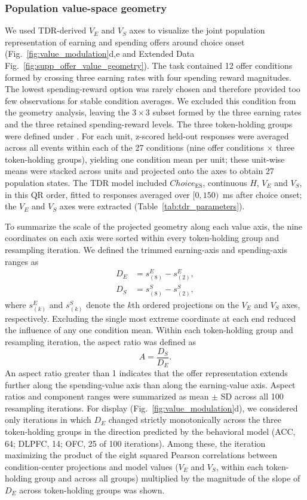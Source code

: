 \documentclass[pdflatex,sn-mathphys-num]{sn-jnl}%
\begin{document}
\subsubsection{Population value-space geometry}\label{sec:m_geometry}
We used TDR-derived $V_E$ and $V_S$ axes to visualize the joint population representation of earning and spending offers around choice onset (Fig.~\ref{fig:value_modulation}d,e and Extended Data Fig.~\ref{fig:supp_offer_value_geometry}). The task contained 12 offer conditions formed by crossing three earning rates with four spending reward magnitudes. The lowest spending-reward option was rarely chosen and therefore provided too few observations for stable condition averages. We excluded this condition from the geometry analysis, leaving the $3\times3$ subset formed by the three earning rates and the three retained spending-reward levels. The three token-holding groups were defined under . For each unit, z-scored held-out responses were averaged across all events within each of the 27 conditions (nine offer conditions $\times$ three token-holding groups), yielding one condition mean per unit; these unit-wise means were stacked across units and projected onto the axes to obtain 27 population states. The TDR model included $\mathit{Choice}_{\mathrm{ES}}$, continuous $H$, $V_E$ and $V_S$, in this QR order, fitted to responses averaged over $[0,150)$~ms after choice onset; the $V_E$ and $V_S$ axes were extracted (Table~\ref{tab:tdr_parameters}).

To summarize the scale of the projected geometry along each value axis, the nine coordinates on each axis were sorted within every token-holding group and resampling iteration. We defined the trimmed earning-axis and spending-axis ranges as
\begin{align}
D_E &= s^E_{(8)}-s^E_{(2)},\\
D_S &= s^S_{(8)}-s^S_{(2)},
\end{align}
where $s^E_{(k)}$ and $s^S_{(k)}$ denote the $k$th ordered projections on the $V_E$ and $V_S$ axes, respectively. Excluding the single most extreme coordinate at each end reduced the influence of any one condition mean. Within each token-holding group and resampling iteration, the aspect ratio was defined as
\begin{equation}
A=\frac{D_S}{D_E}.
\end{equation}
An aspect ratio greater than 1 indicates that the offer representation extends further along the spending-value axis than along the earning-value axis. Aspect ratios and component ranges were summarized as mean $\pm$ SD across all 100 resampling iterations. For display (Fig.~\ref{fig:value_modulation}d), we considered only iterations in which $D_E$ changed strictly monotonically across the three token-holding groups in the direction predicted by the behavioral model (ACC, 64; DLPFC, 14; OFC, 25 of 100 iterations). Among these, the iteration maximizing the product of the eight squared Pearson correlations between condition-center projections and model values ($V_E$ and $V_S$, within each token-holding group and across all groups) multiplied by the magnitude of the slope of $D_E$ across token-holding groups was shown.
\end{document}

